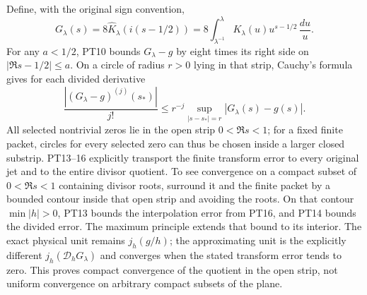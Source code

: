 Define, with the original sign convention,
\begin{equation}\tag{PT15}
 G_\lambda(s)=8\widehat K_\lambda(i(s-1/2))
       =8\int_{\lambda^{-1}}^\lambda K_\lambda(u)
                                         u^{s-1/2}\,\frac{du}{u}.
\end{equation}
For any $a<1/2$, PT10 bounds $G_\lambda-g$ by eight times
its right side on $|\Re s-1/2|\leq a$. On a circle of radius
$r>0$ lying in that strip, Cauchy's formula gives for each
divided derivative
\begin{equation}\tag{PT16}
 \frac{|(G_\lambda-g)^{(j)}(s_*)|}{j!}
       \leq r^{-j}\sup_{|s-s_*|=r}|G_\lambda(s)-g(s)|.
\end{equation}
All selected nontrivial zeros lie in the open strip $0<\Re s<1$;
for a fixed finite packet, circles for every selected zero can
thus be chosen inside a larger closed substrip. PT13--16
explicitly transport the finite transform error to every original
jet and to the entire divisor quotient. To see convergence on a
compact subset of $0<\Re s<1$ containing divisor roots, surround
it and the finite packet by a bounded contour inside that open strip
and avoiding the roots. On that contour $\min|h|>0$,
PT13 bounds the interpolation error from PT16, and PT14 bounds
the divided error. The maximum principle extends that bound
to its interior. The exact physical unit remains $j_h(g/h)$;
the approximating unit is the explicitly different
$j_h(\mathcal D_hG_\lambda)$ and converges when the stated
transform error tends to zero.
This proves compact convergence of the quotient in the open strip,
not uniform convergence on arbitrary compact subsets of the plane.

